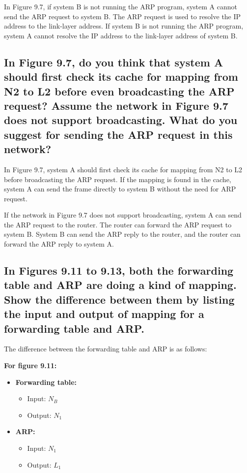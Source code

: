 \documentclass{article}
\begin{document}
In Figure 9.7, if system B is not running the ARP program, system A cannot send the ARP request to system B. The ARP request is used to resolve the IP address to the link-layer address. If system B is not running the ARP program, system A cannot resolve the IP address to the link-layer address of system B.

\subsection{
	In Figure 9.7, do you think that system A should first check its cache for mapping from N2 to L2 before even broadcasting the ARP request?
	Assume the network in Figure 9.7 does not support broadcasting. What do you
	suggest for sending the ARP request in this network?
}

In Figure 9.7, system A should first check its cache for mapping from N2 to L2 before broadcasting the ARP request. If the mapping is found in the cache, system A can send the frame directly to system B without the need for ARP request.

If the network in Figure 9.7 does not support broadcasting, system A can send the ARP request to the router. The router can forward the ARP request to system B. System B can send the ARP reply to the router, and the router can forward the ARP reply to system A.

\subsection{
	In Figures 9.11 to 9.13, both the forwarding table and ARP are doing a kind of
	mapping. Show the difference between them by listing the input and output of
	mapping for a forwarding table and ARP.
}

The difference between the forwarding table and ARP is as follows:

\textbf{For figure 9.11:}
\begin{itemize}
	\item \textbf{ Forwarding table: }
	      \begin{itemize}
		      \item Input: \( N_B \)
		      \item Output: \( N_1 \)
	      \end{itemize}
	\item \textbf{ ARP: }
	      \begin{itemize}
		      \item Input: \(N_1\)
		      \item Output: \(L_1\)
	      \end{itemize}
\end{itemize}
\end{document}
